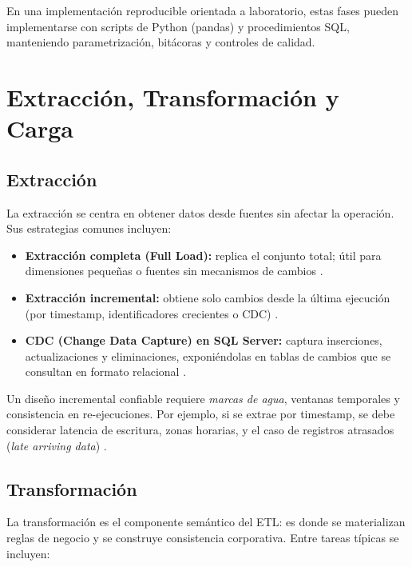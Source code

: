 \documentclass[12pt]{article}
\begin{document}
En una implementación reproducible orientada a laboratorio, estas fases pueden implementarse con scripts de Python (pandas) y procedimientos SQL, manteniendo parametrización, bitácoras y controles de calidad.

\section{Extracción, Transformación y Carga}
\subsection{Extracción}
La extracción se centra en obtener datos desde fuentes sin afectar la operación. Sus estrategias comunes incluyen:

\begin{itemize}[leftmargin=*]
\item \textbf{Extracción completa (Full Load):} replica el conjunto total; útil para dimensiones pequeñas o fuentes sin mecanismos de cambios \cite{ibm_etl}.
\item \textbf{Extracción incremental:} obtiene solo cambios desde la última ejecución (por timestamp, identificadores crecientes o CDC) \cite{ibm_etl}.
\item \textbf{CDC (Change Data Capture) en SQL Server:} captura inserciones, actualizaciones y eliminaciones, exponiéndolas en tablas de cambios que se consultan en formato relacional \cite{ms_cdc_overview}.
\end{itemize}

Un diseño incremental confiable requiere \textit{marcas de agua}, ventanas temporales y consistencia en re-ejecuciones. Por ejemplo, si se extrae por timestamp, se debe considerar latencia de escritura, zonas horarias, y el caso de registros atrasados (\textit{late arriving data}) \cite{kimball_etl_toolkit}.

\subsection{Transformación}
La transformación es el componente semántico del ETL: es donde se materializan reglas de negocio y se construye consistencia corporativa. Entre tareas típicas se incluyen:
\end{document}
